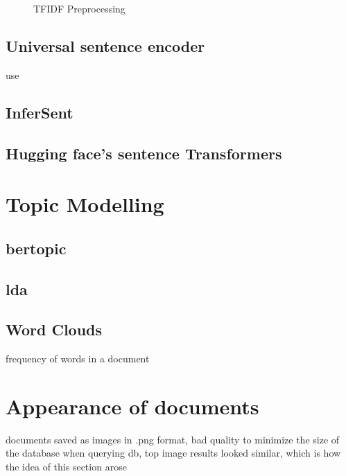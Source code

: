 \begin{figure}[htp] %
    \centering
    
    \caption{TFIDF Preprocessing}
    \label{fig:preprocessing}
\end{figure}

\subsection{Universal sentence encoder}\label{subsec:univ-sent-encoder}
\ac{use}
\cite{UniversalSentEnc2018}

\subsection{InferSent}\label{subsec:inferSent}
\cite{inferSent2018}

\subsection{Hugging face's sentence Transformers}\label{subsec:hf-sent-ransformers}
\cite{HfsentTrans2019}


\section{Topic Modelling}\label{sec:topic-modelling}

\subsection{\ac{bertopic}}\label{subsec:bertopic}

\subsection{\ac{lda}}\label{subsec:latent-dirichlet-allocation}

\subsection{Word Clouds}\label{subsec:word-clouds}
frequency of words in a document


\section{Appearance of documents}\label{sec:appearance}
documents saved as images in .png format, bad quality to minimize the size of the database
when querying db, top image results looked similar, which is how the idea of this section arose

